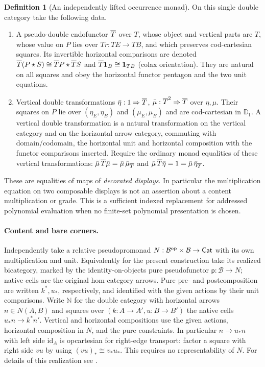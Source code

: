 \documentclass[11pt]{article}
\theoremstyle{definition}\newtheorem{definition}[theorem]{Definition}
\newcommand{\B}{\mathcal B}\newcommand{\J}{\mathcal J}
\newcommand{\D}{\mathbb D}\newcommand{\N}{\mathbb N}
\newcommand{\id}{\mathrm{id}}\newcommand{\op}{\mathrm{op}}\newcommand{\dom}{\mathrm{dom}}
\newcommand{\st}{\mathbin{\star}}\newcommand{\bx}{\mathop{\boxtimes}}
\newcommand{\pure}{\mathsf{p}}\newcommand{\grade}{\mathsf G}
\begin{document}
\begin{definition}[An independently lifted occurrence monad]\label{def:lift}
On this single double category take the following data.
\begin{enumerate}
\item A pseudo-double endofunctor $\overline T$ over $T$, whose object and vertical
parts are $T$, whose value on $P$ lies over $Tr:TE\to TB$, and which
preserves cod-cartesian squares. Its invertible horizontal comparisons
are denoted
$\Tt(P\st S)\cong\Tt P\st\Tt S$ and
$\overline T\mathbf1_B\cong\mathbf1_{TB}$ (colax orientation). They are natural on all
squares and obey the horizontal functor pentagon and the two unit
equations.
\item Vertical double transformations $\bar\eta:1\Rightarrow\overline T$,
$\bar\mu:\overline T^2\Rightarrow\overline T$ over $\eta,\mu$. Their squares
on $P$ lie over $(\eta_E,\eta_B)$ and $(\mu_E,\mu_B)$ and are
cod-cartesian in $\D_1$. A vertical double transformation is a
natural transformation on the vertical category and on the horizontal
arrow category, commuting with domain/codomain, the horizontal unit
and horizontal composition with the functor comparisons inserted.
Require the ordinary monad equalities of these vertical
transformations: $\bar\mu\,\overline T\bar\mu=\bar\mu\,\bar\mu_{\overline T}$ and
$\bar\mu\,\overline T\bar\eta=1=\bar\mu\,\bar\eta_{\overline T}$.
\end{enumerate}
These are equalities of maps of \emph{decorated displays}.
In particular the multiplication equation on two composable displays
is not an assertion about a content multiplication or grade.
This is a sufficient indexed replacement for addressed polynomial
evaluation when no finite-set polynomial presentation is chosen.
\end{definition}

\paragraph{Content and bare corners.}
Independently take a relative pseudopromonad
$N:\B^{\op}\times\B\to\Cat$ with its own multiplication and unit.
Equivalently for the present construction take its realized bicategory,
marked by the identity-on-objects pure pseudofunctor
$\pure:\B\to N$; native cells are the original hom-category arrows.
Pure pre- and postcomposition are written $k^*,u_*$, respectively,
and identified with the given actions by their unit comparisons.
Write $\N$ for the double category with horizontal arrows
$n\in N(A,B)$ and squares over $(k:A\to A',u:B\to B')$ the native
cells $u_*n\to k^*n'$. Vertical and horizontal compositions use the
given actions, horizontal composition in $N$, and the pure constraints.
In particular $n\to u_*n$ with left side $\id_A$ is opcartesian for
right-edge transport: factor a square with right side $vu$ by using
$(vu)_*\cong v_*u_*$. This requires no representability of $N$.
For details of this realization see \cite[Secs.~2--3]{U}.
\end{document}
